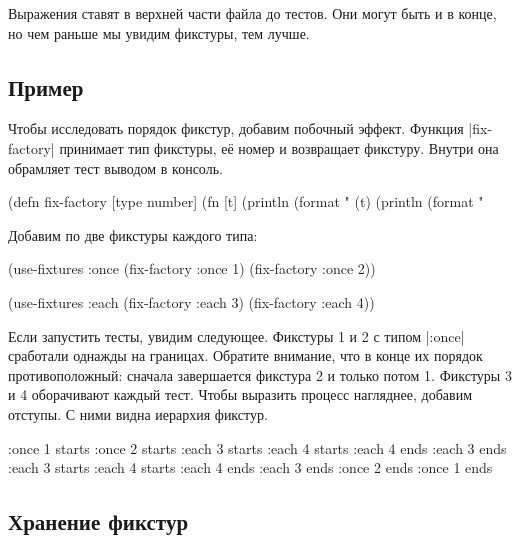Выражения ставят в верхней части файла до тестов. Они могут быть и в конце, но
чем раньше мы увидим фикстуры, тем лучше.

\subsection{Пример}

Чтобы исследовать порядок фикстур, добавим побочный эффект. Функция
\spverb|fix-factory| принимает тип фикстуры, её номер и возвращает
фикстуру. Внутри она обрамляет тест выводом в консоль.


\begin{english}
  \begin{clojure}
(defn fix-factory [type number]
  (fn [t]
    (println (format "%
    (t)
    (println (format "%
  \end{clojure}
\end{english}

\noindent
Добавим по две фикстуры каждого типа:

\begin{english}
  \begin{clojure}
(use-fixtures :once
  (fix-factory :once 1)
  (fix-factory :once 2))

(use-fixtures :each
  (fix-factory :each 3)
  (fix-factory :each 4))
  \end{clojure}
\end{english}

Если запустить тесты, увидим следующее. Фикстуры 1 и 2 с типом \spverb|:once|
сработали однажды на границах. Обратите внимание, что в конце их порядок
противоположный: сначала завершается фикстура 2 и только потом 1. Фикстуры 3 и 4
оборачивают каждый тест. Чтобы выразить процесс нагляднее, добавим отступы. С
ними видна иерархия фикстур.


\begin{english}
  \begin{clojure}
:once 1 starts
  :once 2 starts
    :each 3 starts
      :each 4 starts
      :each 4 ends
    :each 3 ends
    :each 3 starts
      :each 4 starts
      :each 4 ends
    :each 3 ends
  :once 2 ends
:once 1 ends
  \end{clojure}
\end{english}

\subsection{Хранение фикстур}

